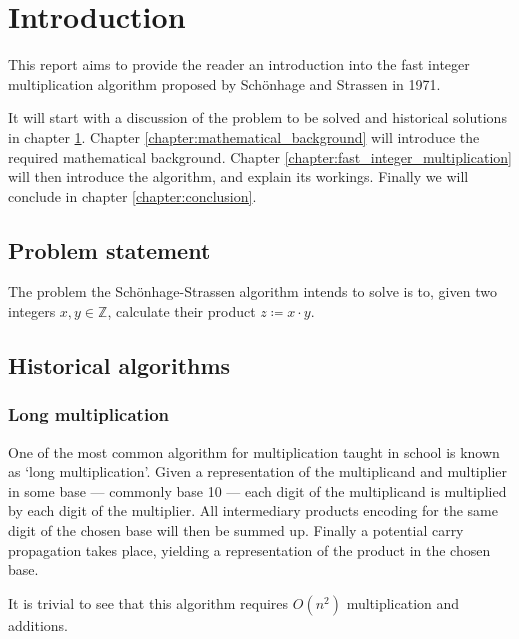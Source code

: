 \chapter{Introduction}
\label{chapter:introduction}

This report aims to provide the reader an introduction into the fast integer
multiplication algorithm proposed by Schönhage and Strassen in 1971.
\autocite{schonhageSchnelleMultiplikationGrosser1971}

It will start with a discussion of the problem to be solved and historical
solutions in chapter \ref{chapter:introduction}. Chapter
\ref{chapter:mathematical_background} will introduce the required mathematical
background. Chapter \ref{chapter:fast_integer_multiplication} will then introduce
the algorithm, and explain its workings. Finally we will conclude in chapter
\ref{chapter:conclusion}.

\section{Problem statement}

The problem the Schönhage-Strassen algorithm intends to solve is to, given two
integers $x, y \in \mathbb{Z}$, calculate their product $z \coloneqq x \cdot
y$.

\section{Historical algorithms}

\subsection{Long multiplication}

One of the most common algorithm for multiplication taught in school is known
as `long multiplication'. Given a representation of the multiplicand and
multiplier in some base --- commonly base 10 --- each digit of the multiplicand
is multiplied by each digit of the multiplier. All intermediary products
encoding for the same digit of the chosen base will then be summed up. Finally
a potential carry propagation takes place, yielding a representation of the
product in the chosen base.

It is trivial to see that this algorithm requires $O(n^2)$ multiplication and additions.

